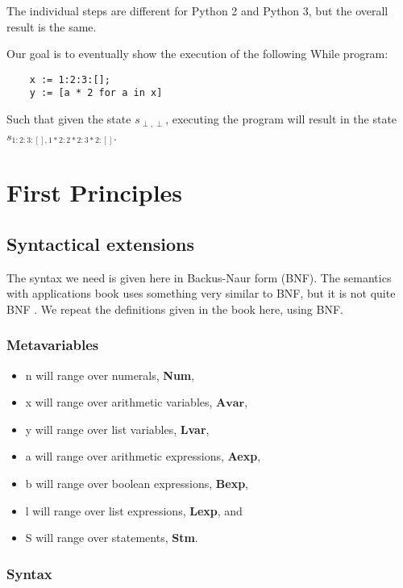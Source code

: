 \documentclass[12pt]{article}
\newcommand{\metavar}[1]{\textlangle#1\textrangle}
\newcommand{\Avar}{\mathbf{Avar}}
\begin{document}
The individual steps are different for Python 2 and Python 3, but the overall result is the same.

Our goal is to eventually show the execution of the following While program:

\begin{lstlisting}
    x := 1:2:3:[];
    y := [a * 2 for a in x]
\end{lstlisting}

Such that given the state $s_{\perp, \perp}$, executing the program will result in the state $s_{1:2:3:[], 1*2:2*2:3*2:[]}$.

\section{First Principles}

\subsection{Syntactical extensions}

The syntax we need is given here in Backus-Naur form (BNF). The semantics with applications book uses something very similar to BNF, but it is not quite BNF \cite[section 1.2]{wiley}. We repeat the definitions given in the book here, using BNF.

\subsubsection{Metavariables}

\begin{itemize}
    \item \metavar{n} will range over numerals, \textbf{Num},
    \item \metavar{x} will range over arithmetic variables, $\Avar$,
    \item \metavar{y} will range over list variables, \textbf{Lvar},
    \item \metavar{a} will range over arithmetic expressions, \textbf{Aexp},
    \item \metavar{b} will range over boolean expressions, \textbf{Bexp},
    \item \metavar{l} will range over list expressions, \textbf{Lexp}, and
    \item \metavar{S} will range over statements, \textbf{Stm}.
\end{itemize}

\subsubsection{Syntax}
\end{document}
